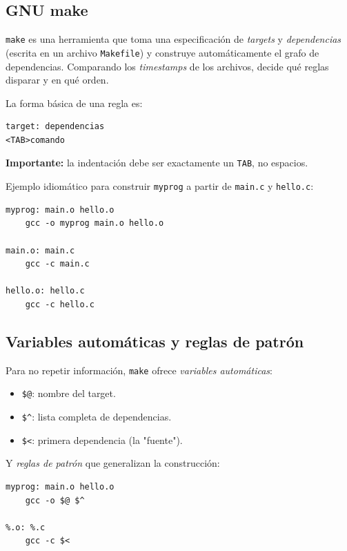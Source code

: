 \documentclass[11pt,a4paper]{article}
\begin{document}
\subsection{GNU make}

\begin{definicion}
\texttt{make} es una herramienta que toma una especificación de
\emph{targets} y \emph{dependencias} (escrita en un archivo
\texttt{Makefile}) y construye automáticamente el grafo de
dependencias. Comparando los \emph{timestamps} de los archivos,
decide qué reglas disparar y en qué orden.
\end{definicion}

La forma básica de una regla es:

\begin{lstlisting}[style=asmstyle]
target: dependencias
<TAB>comando
\end{lstlisting}

\textbf{Importante:} la indentación debe ser exactamente un
\texttt{TAB}, no espacios.

Ejemplo idiomático para construir \texttt{myprog} a partir de
\texttt{main.c} y \texttt{hello.c}:

\begin{lstlisting}[style=asmstyle]
myprog: main.o hello.o
	gcc -o myprog main.o hello.o

main.o: main.c
	gcc -c main.c

hello.o: hello.c
	gcc -c hello.c
\end{lstlisting}

\subsection{Variables automáticas y reglas de patrón}

Para no repetir información, \texttt{make} ofrece \emph{variables
automáticas}:

\begin{itemize}[leftmargin=*]
    \item \texttt{\$@}: nombre del target.
    \item \texttt{\$\^{}}: lista completa de dependencias.
    \item \texttt{\$<}: primera dependencia (la "fuente").
\end{itemize}

Y \emph{reglas de patrón} que generalizan la construcción:

\begin{lstlisting}[style=asmstyle]
myprog: main.o hello.o
	gcc -o $@ $^

%.o: %.c
	gcc -c $<
\end{lstlisting}
\end{document}
